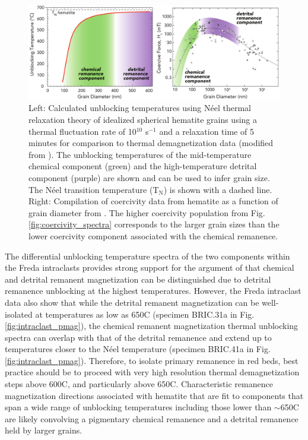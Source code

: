 \documentclass[draft]{agujournal2018}
\begin{document}
\begin{figure}[!ht]
\noindent\includegraphics[width=\textwidth]{figures/component_summary.pdf}
\caption{\small{Left: Calculated unblocking temperatures using N\'eel thermal relaxation theory of idealized spherical hematite grains using a thermal fluctuation rate of 10$^{10}$ s$^{-1}$ and a relaxation time of 5 minutes for comparison to thermal demagnetization data (modified from \citealp{Swanson-Hysell2011a}). The unblocking temperatures of the mid-temperature chemical component (green) and the high-temperature detrital component (purple) are shown and can be used to infer grain size. The N\'eel transition temperature (T$_{\mathrm{N}}$) is shown with a dashed line. Right: Compilation of coercivity data from hematite as a function of grain diameter from \cite{Ozdemir2014a}. The higher coercivity population from Fig. \ref{fig:coercivity_spectra} corresponds to the larger grain sizes than the lower coercivity component associated with the chemical remanence.}}
\label{fig:summary}
\end{figure}

The differential unblocking temperature spectra of the two components within the Freda intraclasts provides strong support for the argument of \citet{Jiang2015a} that chemical and detrital remanent magnetization can be distinguished due to detrital remanence unblocking at the highest temperatures. However, the Freda intraclast data also show that while the detrital remanent magnetization can be well-isolated at temperatures as low as 650\textdegree C (specimen BRIC.31a in Fig. \ref{fig:intraclast_pmag}), the chemical remanent magnetization thermal unblocking spectra can overlap with that of the detrital remanence and extend up to temperatures closer to the N\'eel temperature (specimen BRIC.41a in Fig. \ref{fig:intraclast_pmag}). Therefore, to isolate primary remanence in red beds, best practice should be to proceed with very high resolution thermal demagnetization steps above 600\textdegree C, and particularly above 650\textdegree C. Characteristic remanence magnetization directions associated with hematite that are fit to components that span a wide range of unblocking temperatures including those lower than $\sim$650\textdegree C are likely convolving a pigmentary chemical remanence and a detrital remanence held by larger grains. 
\end{document}
